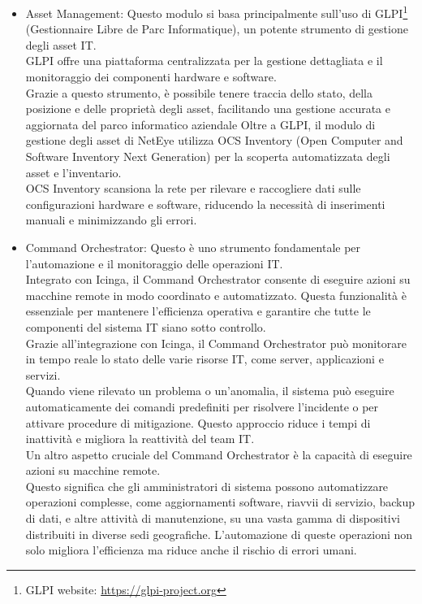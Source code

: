 \begin{itemize}
  \item Asset Management: Questo modulo si basa principalmente sull'uso di GLPI\footnote{GLPI
    website: \url{https://glpi-project.org}} (Gestionnaire Libre de Parc
    Informatique), un potente strumento di gestione degli asset IT.\\ GLPI offre
    una piattaforma centralizzata per la gestione dettagliata e il monitoraggio
    dei componenti hardware e software.\\ Grazie a questo strumento, è possibile
    tenere traccia dello stato, della posizione e delle proprietà degli asset, facilitando
    una gestione accurata e aggiornata del parco informatico aziendale Oltre a GLPI,
    il modulo di gestione degli asset di NetEye utilizza OCS Inventory (Open Computer
    and Software Inventory Next Generation) per la scoperta automatizzata degli
    asset e l'inventario.\\ OCS Inventory scansiona la rete per rilevare e
    raccogliere dati sulle configurazioni hardware e software, riducendo la necessità
    di inserimenti manuali e minimizzando gli errori.

  \item Command Orchestrator: Questo è uno strumento fondamentale per l'automazione
    e il monitoraggio delle operazioni IT.\\ Integrato con Icinga, il Command Orchestrator
    consente di eseguire azioni su macchine remote in modo coordinato e automatizzato.
    Questa funzionalità è essenziale per mantenere l'efficienza operativa e
    garantire che tutte le componenti del sistema IT siano sotto controllo.\\
    Grazie all'integrazione con Icinga, il Command Orchestrator può monitorare in
    tempo reale lo stato delle varie risorse IT, come server, applicazioni e servizi.\\
    Quando viene rilevato un problema o un'anomalia, il sistema può eseguire
    automaticamente dei comandi predefiniti per risolvere l'incidente o per
    attivare procedure di mitigazione. Questo approccio riduce i tempi di inattività
    e migliora la reattività del team IT.\\ Un altro aspetto cruciale del Command
    Orchestrator è la capacità di eseguire azioni su macchine remote.\\ Questo significa
    che gli amministratori di sistema possono automatizzare operazioni complesse,
    come aggiornamenti software, riavvii di servizio, backup di dati, e altre attività
    di manutenzione, su una vasta gamma di dispositivi distribuiti in diverse
    sedi geografiche. L'automazione di queste operazioni non solo migliora l'efficienza
    ma riduce anche il rischio di errori umani.


\end{itemize}
